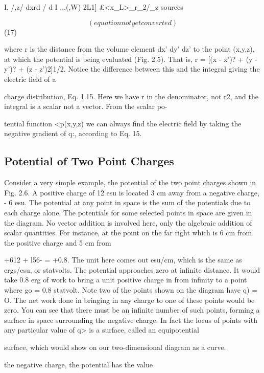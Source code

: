 I, /,z/ dxrd / d I
.,,(,W) 2L1] £<x_L>_r_2/_z
sources

\begin{equation}
(equation not yet converted)
\end{equation}
(17)

where r is the distance from the volume element dx' dy' dz' to the
point (x,y,z), at which the potential is being evaluated (Fig. 2.5).
That is, r = [(x - x')? + (y - y')? + (z - z')2]1/2. Notice the
difference between this and the integral giving the electric field of a

charge distribution, Eq. 1.15. Here we have r in the denominator,
not r2, and the integral is a scalar not a vector. From the scalar po-

tential function <p(x,y,z) we can always find the electric field by taking
the negative gradient of q:, according to Eq. 15.

\subsection{Potential of Two Point Charges}

 Consider a very simple example,
the potential of the two point charges shown in Fig. 2.6. A positive
charge of 12 esu is located 3 cm away from a negative charge, - 6 esu.
The potential at any point in space is the sum of the potentials due to
each charge alone. The potentials for some selected points in space
are given in the diagram. No vector addition is involved here, only
the algebraic addition of scalar quantities. For instance, at the point
on the far right which is 6 cm from the positive charge and 5 cm from

+612 + l56- = +0.8.
The unit here comes out esu/cm, which is the same as ergs/esu, or
statvolts. The potential approaches zero at infinite distance. It
would take 0.8 erg of work to bring a unit positive charge in from
infinity to a point where go = 0.8 statvolt. Note two of the points
shown on the diagram have q) = O. The net work done in bringing
in any charge to one of these points would be zero. You can see that
there must be an infinite number of such points, forming a surface in
space surrounding the negative charge. In fact the locus of points
with any particular value of q> is a surface, called an equipotential

surface, which would show on our two-dimensional diagram as a
curve.

the negative charge, the potential has the value

